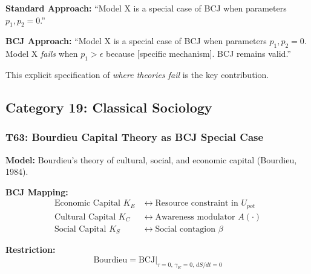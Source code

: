 \begin{tcolorbox}[colback=orange!5!white, colframe=orange!75!black,
    title=Why Boundary Conditions Matter]
\textbf{Standard Approach:} ``Model X is a special case of BCJ when parameters $p_1, p_2 = 0$.''

\textbf{BCJ Approach:} ``Model X is a special case of BCJ when parameters $p_1, p_2 = 0$. Model X \textit{fails} when $p_1 > \epsilon$ because [specific mechanism]. BCJ remains valid.''

This explicit specification of \textit{where theories fail} is the key contribution.
\end{tcolorbox}


\subsection{Category 19: Classical Sociology}

\subsubsection*{T63: Bourdieu Capital Theory as BCJ Special Case}

\textbf{Model:} Bourdieu's theory of cultural, social, and economic capital (Bourdieu, 1984).

\textbf{BCJ Mapping:}
\begin{align}
\text{Economic Capital } K_E &\leftrightarrow \text{Resource constraint in } U_{pot} \\
\text{Cultural Capital } K_C &\leftrightarrow \text{Awareness modulator } A(\cdot) \\
\text{Social Capital } K_S &\leftrightarrow \text{Social contagion } \beta
\end{align}

\textbf{Restriction:}
\begin{equation}
\boxed{\text{Bourdieu} = \text{BCJ} \big|_{\tau = 0, \, \gamma_{K} = 0, \, dS/dt = 0}}
\end{equation}

